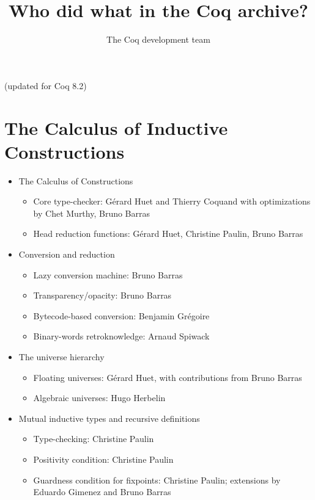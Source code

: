 \documentclass{article}
\begin{document}
\title{Who did what in the Coq archive?}

\author{The Coq development team}

\maketitle

\centerline{(updated for Coq 8.2)}

\section{The Calculus of Inductive Constructions}

\begin{itemize}
\item The Calculus of Constructions
  \begin{itemize}
  \item Core type-checker: Gérard Huet and Thierry Coquand with
    optimizations by Chet Murthy, Bruno Barras
  \item Head reduction functions: Gérard Huet, Christine Paulin, Bruno Barras
  \end{itemize}
\item Conversion and reduction
  \begin{itemize}
  \item Lazy conversion machine: Bruno Barras
  \item Transparency/opacity: Bruno Barras
  \item Bytecode-based conversion: Benjamin Grégoire
  \item Binary-words retroknowledge: Arnaud Spiwack 
  \end{itemize}
\item The universe hierarchy
  \begin{itemize}
  \item Floating universes: Gérard Huet, with contributions from Bruno Barras
  \item Algebraic universes: Hugo Herbelin
  \end{itemize}
\item Mutual inductive types and recursive definitions
  \begin{itemize}
  \item Type-checking: Christine Paulin
  \item Positivity condition: Christine Paulin
  \item Guardness condition for fixpoints: Christine Paulin;
    extensions by Eduardo Gimenez and Bruno Barras

\end{itemize}
\end{itemize}
\end{document}
